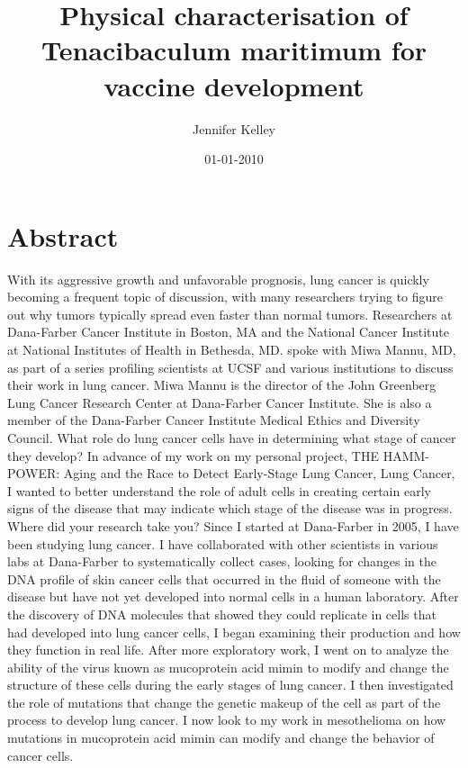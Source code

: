 \documentclass{article}%
\title{Physical characterisation of Tenacibaculum maritimum for vaccine development}%
\author{Jennifer Kelley}%
\affil{Division of Cardio{-}Vascular Medicine, Department of Internal Medicine, Kurume University School of Medicine, Fukuoka, Japan}%
\date{01{-}01{-}2010}%
\begin{document}
%
\normalsize%
\maketitle%
\section{Abstract}%
\label{sec:Abstract}%
With its aggressive growth and unfavorable prognosis, lung cancer is quickly becoming a frequent topic of discussion, with many researchers trying to figure out why tumors typically spread even faster than normal tumors. Researchers at Dana{-}Farber Cancer Institute in Boston, MA and the National Cancer Institute at National Institutes of Health in Bethesda, MD. spoke with Miwa Mannu, MD, as part of a series profiling scientists at UCSF and various institutions to discuss their work in lung cancer. Miwa Mannu is the director of the John Greenberg Lung Cancer Research Center at Dana{-}Farber Cancer Institute. She is also a member of the Dana{-}Farber Cancer Institute Medical Ethics and Diversity Council.\newline%
What role do lung cancer cells have in determining what stage of cancer they develop?\newline%
In advance of my work on my personal project, THE HAMM{-}POWER: Aging and the Race to Detect Early{-}Stage Lung Cancer, Lung Cancer, I wanted to better understand the role of adult cells in creating certain early signs of the disease that may indicate which stage of the disease was in progress.\newline%
Where did your research take you?\newline%
Since I started at Dana{-}Farber in 2005, I have been studying lung cancer. I have collaborated with other scientists in various labs at Dana{-}Farber to systematically collect cases, looking for changes in the DNA profile of skin cancer cells that occurred in the fluid of someone with the disease but have not yet developed into normal cells in a human laboratory. After the discovery of DNA molecules that showed they could replicate in cells that had developed into lung cancer cells, I began examining their production and how they function in real life. After more exploratory work, I went on to analyze the ability of the virus known as mucoprotein acid mimin to modify and change the structure of these cells during the early stages of lung cancer. I then investigated the role of mutations that change the genetic makeup of the cell as part of the process to develop lung cancer. I now look to my work in mesothelioma on how mutations in mucoprotein acid mimin can modify and change the behavior of cancer cells.\newline%
\end{document}
